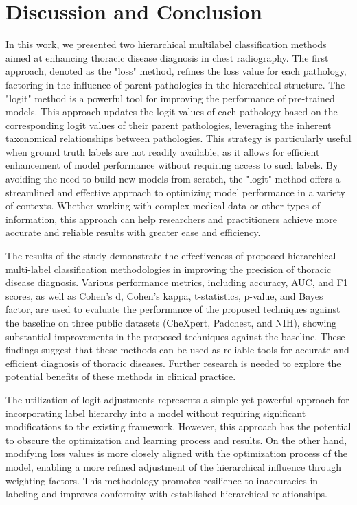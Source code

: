 \section{Discussion and Conclusion}
In this work, we presented two hierarchical multilabel classification methods aimed at enhancing thoracic disease diagnosis in chest radiography. The first approach, denoted as the "loss" method, refines the loss value for each pathology, factoring in the influence of parent pathologies in the hierarchical structure.  The "logit" method is a powerful tool for improving the performance of pre-trained models. This approach updates the logit values of each pathology based on the corresponding logit values of their parent pathologies, leveraging the inherent taxonomical relationships between pathologies. This strategy is particularly useful when ground truth labels are not readily available, as it allows for efficient enhancement of model performance without requiring access to such labels. By avoiding the need to build new models from scratch, the "logit" method offers a streamlined and effective approach to optimizing model performance in a variety of contexts. Whether working with complex medical data or other types of information, this approach can help researchers and practitioners achieve more accurate and reliable results with greater ease and efficiency. 

The results of the study demonstrate the effectiveness of proposed hierarchical multi-label classification methodologies in improving the precision of thoracic disease diagnosis. Various performance metrics, including accuracy, AUC, and F1 scores, as well as Cohen's d, Cohen's kappa, t-statistics, p-value, and Bayes factor, are used to evaluate the performance of the proposed techniques against the baseline on three public datasets (CheXpert, Padchest, and NIH), showing substantial improvements in the proposed techniques against the baseline. These findings suggest that these methods can be used as reliable tools for accurate and efficient diagnosis of thoracic diseases. Further research is needed to explore the potential benefits of these methods in clinical practice.

The utilization of logit adjustments represents a simple yet powerful approach for incorporating label hierarchy into a model without requiring significant modifications to the existing framework. However, this approach has the potential to obscure the optimization and learning process and results. On the other hand, modifying loss values is more closely aligned with the optimization process of the model, enabling a more refined adjustment of the hierarchical influence through weighting factors. This methodology promotes resilience to inaccuracies in labeling and improves conformity with established hierarchical relationships.

